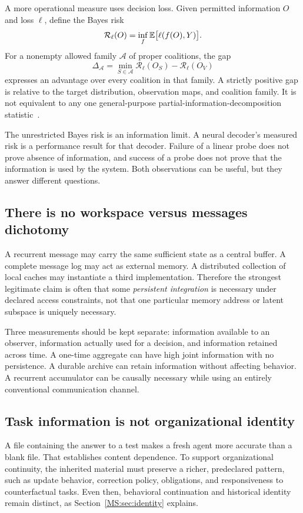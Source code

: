 A more operational measure uses decision loss. Given permitted information $O$ and loss $\ell$, define the Bayes risk
\[
\mathcal R_\ell(O)=\inf_f\mathbb E\bigl[\ell(f(O),Y)\bigr].
\]
For a nonempty allowed family $\mathcal A$ of proper coalitions, the gap
\begin{equation}\label{MS:eq:coalition}
\Delta_{\mathcal A}=\min_{S\in\mathcal A}\mathcal R_\ell(O_S)
-\mathcal R_\ell(O_V)
\end{equation}
expresses an advantage over every coalition in that family. A strictly positive gap is relative to the target distribution, observation maps, and coalition family. It is not equivalent to any one general-purpose partial-information-decomposition statistic~\cite{MS:williams}.

The unrestricted Bayes risk is an information limit. A neural decoder's measured risk is a performance result for that decoder. Failure of a linear probe does not prove absence of information, and success of a probe does not prove that the information is used by the system. Both observations can be useful, but they answer different questions.

\subsection{There is no workspace versus messages dichotomy}
A recurrent message may carry the same sufficient state as a central buffer. A complete message log may act as external memory. A distributed collection of local caches may instantiate a third implementation. Therefore the strongest legitimate claim is often that some \emph{persistent integration} is necessary under declared access constraints, not that one particular memory address or latent subspace is uniquely necessary.

Three measurements should be kept separate: information available to an observer, information actually used for a decision, and information retained across time. A one-time aggregate can have high joint information with no persistence. A durable archive can retain information without affecting behavior. A recurrent accumulator can be causally necessary while using an entirely conventional communication channel.

\subsection{Task information is not organizational identity}
A file containing the answer to a test makes a fresh agent more accurate than a blank file. That establishes content dependence. To support organizational continuity, the inherited material must preserve a richer, predeclared pattern, such as update behavior, correction policy, obligations, and responsiveness to counterfactual tasks. Even then, behavioral continuation and historical identity remain distinct, as Section~\ref{MS:sec:identity} explains.

